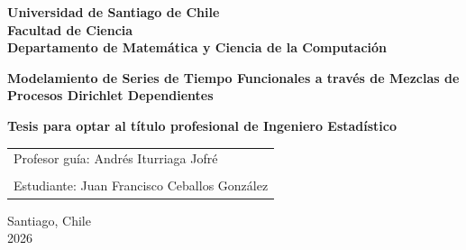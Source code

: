 \documentclass[letterpaper,openright,12pt]{book}
\theoremstyle{definition} %
\begin{document}

\begin{titlepage}
\pagestyle{plain}
\begin{center}
\end{center}
\begin{center}
{\bf Universidad de Santiago de Chile\\ Facultad de Ciencia\\ Departamento de Matemática y Ciencia de la Computación}
\end{center} 
\vspace{2cm}
\begin{center}

{\huge \bf Modelamiento de Series de Tiempo Funcionales a través de Mezclas de Procesos Dirichlet  Dependientes\\

}

\end{center}

\begin{center}
\vspace{2cm}
{\bf Tesis para optar al título profesional de Ingeniero Estadístico}\\
\end{center}
\vspace{4cm}

\begin{flushleft}
\begin{tabular}{ l }
%
%

Profesor guía: Andrés Iturriaga Jofré\\

\vspace{1mm}\\

Estudiante: Juan Francisco Ceballos González\\

\end{tabular}
\end{flushleft}

\vfill
\begin{center}
Santiago, Chile\\
2026
\end{center}

\end{titlepage}
\frontmatter %
\end{document}

